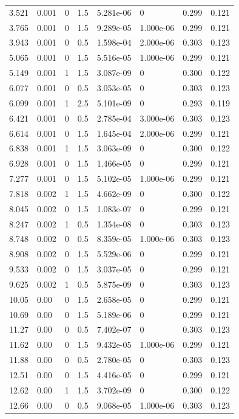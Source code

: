 \documentclass[preview]{standalone}
\begin{document}
{{\begin{tabular}{L{1.2cm}C{1.2cm} C{0.3cm}C{0.5cm} C{1.4cm}C{1.4cm} C{1.4cm}C{1.4cm}}
  3.521  &  0.001  & 0     & 1.5 &  5.281e-06  & 0  & 0.299 &  0.121   \\ 
  3.765  &  0.001  & 0     & 1.5 &  9.289e-05  & 1.000e-06  & 0.299 &  0.121   \\ 
  3.943  &  0.001  & 0     & 0.5 &  1.598e-04  & 2.000e-06  & 0.303 &  0.123   \\ 
  5.065  &  0.001  & 0     & 1.5 &  5.516e-05  & 1.000e-06  & 0.299 &  0.121   \\ 
  5.149  &  0.001  & 1     & 1.5 &  3.087e-09  & 0  & 0.300 &  0.122   \\ 
  6.077  &  0.001  & 0     & 0.5 &  3.053e-05  & 0  & 0.303 &  0.123   \\ 
  6.099  &  0.001  & 1     & 2.5 &  5.101e-09  & 0  & 0.293 &  0.119   \\ 
  6.421  &  0.001  & 0     & 0.5 &  2.785e-04  & 3.000e-06  & 0.303 &  0.123   \\ 
  6.614  &  0.001  & 0     & 1.5 &  1.645e-04  & 2.000e-06  & 0.299 &  0.121   \\ 
  6.838  &  0.001  & 1     & 1.5 &  3.063e-09  & 0  & 0.300 &  0.122   \\ 
  6.928  &  0.001  & 0     & 1.5 &  1.466e-05  & 0  & 0.299 &  0.121   \\ 
  7.277  &  0.001  & 0     & 1.5 &  5.102e-05  & 1.000e-06  & 0.299 &  0.121   \\ 
  7.818  &  0.002  & 1     & 1.5 &  4.662e-09  & 0  & 0.300 &  0.122   \\ 
  8.045  &  0.002  & 0     & 1.5 &  1.083e-07  & 0  & 0.299 &  0.121   \\ 
  8.247  &  0.002  & 1     & 0.5 &  1.354e-08  & 0  & 0.303 &  0.123   \\ 
  8.748  &  0.002  & 0     & 0.5 &  8.359e-05  & 1.000e-06  & 0.303 &  0.123   \\ 
  8.908  &  0.002  & 0     & 1.5 &  5.529e-06  & 0  & 0.299 &  0.121   \\ 
  9.533  &  0.002  & 0     & 1.5 &  3.037e-05  & 0  & 0.299 &  0.121   \\ 
  9.625  &  0.002  & 1     & 0.5 &  5.875e-09  & 0  & 0.303 &  0.123   \\ 
  10.05  &  0.00  & 0     & 1.5 &  2.658e-05  & 0  & 0.299 &  0.121   \\ 
  10.69  &  0.00  & 0     & 1.5 &  5.189e-06  & 0  & 0.299 &  0.121   \\ 
  11.27  &  0.00  & 0     & 0.5 &  7.402e-07  & 0  & 0.303 &  0.123   \\ 
  11.62  &  0.00  & 0     & 1.5 &  9.432e-05  & 1.000e-06  & 0.299 &  0.121   \\ 
  11.88  &  0.00  & 0     & 0.5 &  2.780e-05  & 0  & 0.303 &  0.123   \\ 
  12.51  &  0.00  & 0     & 1.5 &  4.416e-05  & 0  & 0.299 &  0.121   \\ 
  12.62  &  0.00  & 1     & 1.5 &  3.702e-09  & 0  & 0.300 &  0.122   \\ 
  12.66  &  0.00  & 0     & 0.5 &  9.068e-05  & 1.000e-06  & 0.303 &  0.123   \\ 
\hline 
\end{tabular} 

}}
\end{document}
